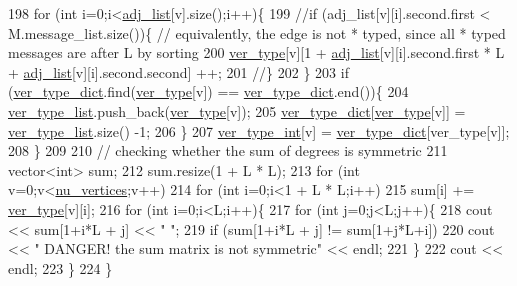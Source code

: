 \begin{DoxyCode}
198     \textcolor{keywordflow}{for} (\textcolor{keywordtype}{int} i=0;i<\hyperlink{classcolored__graph_a45dce16965079286cf3f41a54a1b2ea4}{adj\_list}[v].size();i++)\{
199       \textcolor{comment}{//if (adj\_list[v][i].second.first < M.message\_list.size())\{ // equivalently, the edge is not * typed,
       since all * typed messages are after L by sorting}
200       \hyperlink{classcolored__graph_a2cc32e7146fa3319f83cfa940f5e1be4}{ver\_type}[v][1 +  \hyperlink{classcolored__graph_a45dce16965079286cf3f41a54a1b2ea4}{adj\_list}[v][i].second.first * L + 
      \hyperlink{classcolored__graph_a45dce16965079286cf3f41a54a1b2ea4}{adj\_list}[v][i].second.second] ++;
201       \textcolor{comment}{//\}}
202     \}
203     \textcolor{keywordflow}{if} (\hyperlink{classcolored__graph_aeb780762429ddac375799f4a45405712}{ver\_type\_dict}.find(\hyperlink{classcolored__graph_a2cc32e7146fa3319f83cfa940f5e1be4}{ver\_type}[v]) == \hyperlink{classcolored__graph_aeb780762429ddac375799f4a45405712}{ver\_type\_dict}.end())\{
204       \hyperlink{classcolored__graph_a3a1ae8abac458d20a2afb4aa48bbc956}{ver\_type\_list}.push\_back(\hyperlink{classcolored__graph_a2cc32e7146fa3319f83cfa940f5e1be4}{ver\_type}[v]);
205       \hyperlink{classcolored__graph_aeb780762429ddac375799f4a45405712}{ver\_type\_dict}[\hyperlink{classcolored__graph_a2cc32e7146fa3319f83cfa940f5e1be4}{ver\_type}[v]] = \hyperlink{classcolored__graph_a3a1ae8abac458d20a2afb4aa48bbc956}{ver\_type\_list}.size() -1;
206     \}
207     \hyperlink{classcolored__graph_a491ed2ea1a65118af02ec606c8d44c0a}{ver\_type\_int}[v] = \hyperlink{classcolored__graph_aeb780762429ddac375799f4a45405712}{ver\_type\_dict}[ver\_type[v]];
208   \}
209 
210   \textcolor{comment}{// checking whether the sum of degrees is symmetric}
211   vector<int> sum;
212   sum.resize(1 + L * L);
213   \textcolor{keywordflow}{for} (\textcolor{keywordtype}{int} v=0;v<\hyperlink{classcolored__graph_a90ece8eb1fec52f3f41549ab527c1d5b}{nu\_vertices};v++)
214     \textcolor{keywordflow}{for} (\textcolor{keywordtype}{int} i=0;i<1 + L * L;i++)
215       sum[i] += \hyperlink{classcolored__graph_a2cc32e7146fa3319f83cfa940f5e1be4}{ver\_type}[v][i];
216   \textcolor{keywordflow}{for} (\textcolor{keywordtype}{int} i=0;i<L;i++)\{
217     \textcolor{keywordflow}{for} (\textcolor{keywordtype}{int} j=0;j<L;j++)\{
218       cout << sum[1+i*L + j] << \textcolor{stringliteral}{" "};
219       \textcolor{keywordflow}{if} (sum[1+i*L + j] != sum[1+j*L+i])
220         cout << \textcolor{stringliteral}{" DANGER! the sum matrix is not symmetric"} << endl;
221     \}
222     cout << endl;
223   \}
224 \}
\end{DoxyCode}


